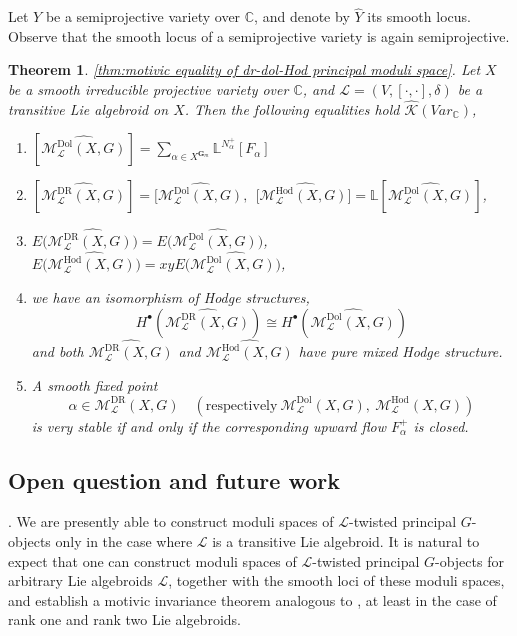 \documentclass[12pt,reqno]{amsart}
\numberwithin{equation}{subsection}
\newtheorem{thm}[equation]{Theorem}
\theoremstyle{definition}
\theoremstyle{theorem}
\begin{document}
Let \(Y\) be a semiprojective variety over \(\mathbb{C}\), and denote by \(\widehat{Y}\) its smooth locus. Observe that the smooth locus of a semiprojective variety is again semiprojective.
\begin{thm}\eqref{thm:motivic equality of dr-dol-Hod principal moduli space}.
	Let $X$ be a smooth irreducible projective variety over $\mathbb{C}$, and $\mathcal{L} = (V,[·,·],\delta)$ be a transitive Lie algebroid on $X$. Then the following equalities hold $\hat{\mathcal{K}}(Var_{\mathbb{C}})$,
	
	\begin{enumerate}
		\item $[\widehat{\mathcal{M}^{\text{Dol}}_{\mathcal{L}}(X,G)}]=\sum_{\alpha\in X^{\mathbf{G}_{m}}}\mathbb{L}^{N_{\alpha}^{+}}[F_{\alpha}]$
		
		\item $[\widehat{\mathcal{M}^{\text{DR}}_{\mathcal{L}}(X,G)}] = [\widehat{\mathcal{M}_{\mathcal{L}}^{\text{Dol}}(X,G)}, \ \  [\widehat{\mathcal{M}_{\mathcal{L}}^{\text{Hod}}(X,G)]} = \mathbb{L}[\widehat{\mathcal{M}_{\mathcal{L}}^{\text{Dol}}(X,G)}]$,
		
		\item $E(\widehat{\mathcal{M}_{\mathcal{L}}^{\text{DR}}(X,G))} = E(\widehat{\mathcal{M}_{\mathcal{L}}^{\text{Dol}}(X,G))}$, \ \  $E(\widehat{\mathcal{M}_{\mathcal{L}}^{\text{Hod}}(X,G))} = xyE(\widehat{\mathcal{M}_{\mathcal{L}}^{\text{Dol}}(X,G))}$,
		
		\item we have an isomorphism of Hodge structures,
		\[H^{\bullet}(\widehat{\mathcal{M}_{\mathcal{L}}^{\text{DR}}(X,G)}) \cong H^{\bullet}(\widehat{\mathcal{M}_{\mathcal{L}}^{\text{Dol}}(X,G)})\]and both $\widehat{\mathcal{M}_{\mathcal{L}}^{\text{DR}}(X,G)}$ and $\widehat{\mathcal{M}_{\mathcal{L}}^{\text{Hod}}(X,G)}$ have pure mixed Hodge structure.
		
		
		\item A smooth fixed point 
		\[
		\alpha \in \mathcal{M}^{\mathrm{DR}}_{\mathcal{L}}(X,G)
		\quad 
		\left(\text{respectively} \ 
		\mathcal{M}^{\mathrm{Dol}}_{\mathcal{L}}(X,G),\ 
		\mathcal{M}^{\mathrm{Hod}}_{\mathcal{L}}(X,G)
		\right)
		\]
		is very stable if and only if the corresponding upward flow \(F^{+}_{\alpha}\) is closed.
	\end{enumerate}
	
\end{thm}

\subsection{Open question and future work}. 
We are presently able to construct moduli spaces of \(\mathcal{L}\)-twisted principal \(G\)-objects only in the case where \(\mathcal{L}\) is a transitive Lie algebroid. It is natural to expect that one can construct moduli spaces of \(\mathcal{L}\)-twisted principal \(G\)-objects for arbitrary Lie algebroids \(\mathcal{L}\), together with the smooth loci of these moduli spaces, and establish a motivic invariance theorem analogous to \cite[Theorem~7.1]{Alfaya-Oliveire-2024}, at least in the case of rank one and rank two Lie algebroids.
\end{document}

